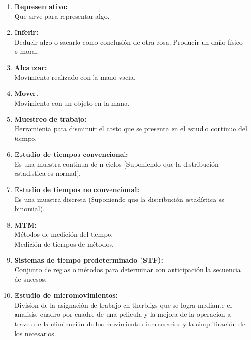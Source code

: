 \begin{enumerate}
    \item  \textbf {Representativo:}
    \\Que sirve para representar algo.
   
    \item \textbf{ Inferir:}
    \\Deducir algo o sacarlo como conclusión de otra cosa. Producir un daño físico o moral.
  
    \item  \textbf {Alcanzar: }
    \\Movimiento realizado con la mano vacia.
    
    \item  \textbf {Mover:}
    \\Movimiento con un objeto en la mano.
   
    \item  \textbf {Muestreo de trabajo: }
    \\Herramienta para disminuir el costo que se presenta en el estudio continuo del tiempo.
    
    \item  \textbf {Estudio de tiempos convencional: }
    \\Es una muestra continua de n ciclos (Suponiendo que la distribución estadística es normal).
    
    \item \textbf{ Estudio de tiempos no convencional:} 
    \\Es una muestra discreta (Suponiendo que la distribución estadística es binomial).
   \item \textbf{MTM: }
    \\Métodos de medición del tiempo.
    \\Medición de tiempos de métodos.
 \item \textbf{Sistemas de tiempo predeterminado (STP): }
    \\ Conjunto de reglas o métodos para determinar con anticipación la secuencia de sucesos.
    
    \item \textbf{Estudio de micromovimientos: }
    \\Division de la asignación de trabajo en therbligs que se logra mediante el analisis, cuadro por cuadro de una pelicula y la mejora de la operación a traves de la eliminación de los movimientos innecesarios y la simplificación de los necesarios.
\end{enumerate}


